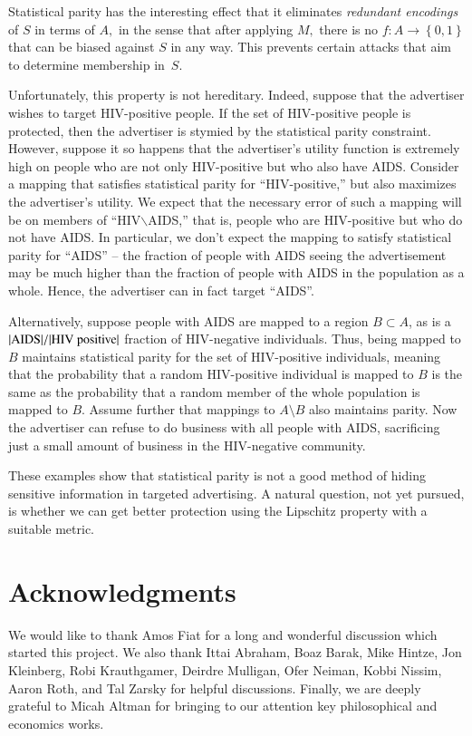 \documentclass[letterpaper,11pt]{article}
\theoremstyle{definition}
\newcommand{\bits}{\left\{0,1\right\}}
\begin{document}
Statistical parity has the interesting effect that it eliminates
\emph{redundant encodings} of $S$ in terms of $A,$ in the sense that
after applying $M,$ there is no $f\colon A\to\bits$ that can be biased
against $S$ in any way. This prevents certain attacks that aim to
determine membership in~$S$.

Unfortunately, this property is not hereditary.  Indeed, suppose that the
advertiser wishes to target HIV-positive people.  If the set of HIV-positive
people is protected, then the advertiser is stymied by the statistical parity
constraint.  However, suppose it so happens that the advertiser's utility
function is extremely high on people who are not only HIV-positive but who
also have AIDS.  Consider a mapping that satisfies statistical parity for
``HIV-positive,'' but also maximizes the advertiser's utility.  We expect that
the necessary error of such a mapping will be on members of
``HIV$\backslash$AIDS,'' that is, people who are HIV-positive but who do not
have AIDS.  In particular, we don't expect the mapping to satisfy statistical
parity for ``AIDS'' -- the fraction of people with AIDS seeing the
advertisement may be much higher than the fraction of people with AIDS in the
population as a whole. Hence, the advertiser can in fact target ``AIDS''.

Alternatively, suppose people with AIDS are mapped to a region $B \subset A$,
as is a $|{\rm AIDS}|/|\rm{HIV~positive}|$ fraction of HIV-negative
individuals.  Thus, being mapped to $B$ maintains statistical parity for the
set of HIV-positive individuals, meaning that the probability that a random
HIV-positive individual is mapped to $B$ is the same as the probability that a
random member of the whole population is mapped to $B$.  Assume further that
mappings to $A \setminus B$ also maintains parity.  Now the advertiser can
refuse to do business with all people with AIDS, sacrificing just a small amount of business
in the HIV-negative community.


These examples show that statistical parity is not a good 
method of hiding sensitive information in
targeted advertising.  A natural question, not yet pursued, is whether we can
get better protection using the Lipschitz property with a suitable metric.


\section*{Acknowledgments}

We would like to thank Amos Fiat for a long and wonderful discussion
which started this project.  We also thank Ittai Abraham, Boaz Barak,
Mike Hintze, Jon Kleinberg, Robi Krauthgamer, Deirdre Mulligan, Ofer
Neiman, Kobbi Nissim, Aaron Roth, and Tal Zarsky for helpful
discussions.  Finally, we are deeply grateful to Micah Altman for
bringing to our attention key philosophical and economics works.
\end{document}
